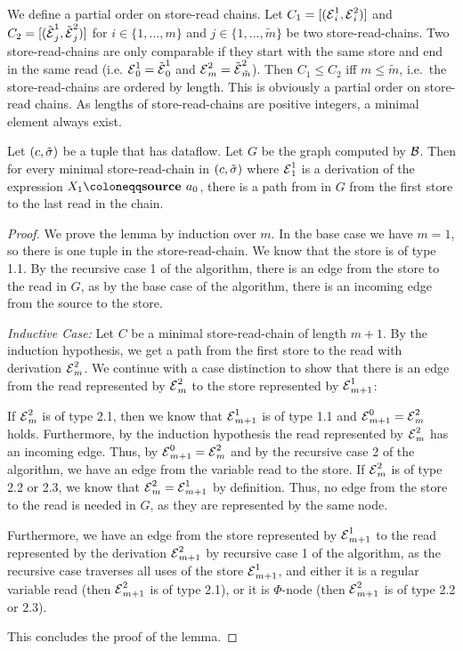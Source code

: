 \begin{definition}
    We define a partial order on store-read chains.
    Let $C_1 = [(\operatorname{\mathcal{E}}^1_i, \operatorname{\mathcal{E}}^2_i)]$ and $C_2 = [(\tilde{\operatorname{\mathcal{E}}}^1_j, \tilde{\operatorname{\mathcal{E}}}^2_j)]$ for $i \in \{1, \ldots, m\}$ and
    $j \in \{1, \ldots, \tilde{m}\}$ be two store-read-chains.
    Two store-read-chains are only comparable if they start with the same store and 
    end in the same read (i.e. $\operatorname{\mathcal{E}}^1_0 = \tilde{\operatorname{\mathcal{E}}}^1_0$ and $\operatorname{\mathcal{E}}^2_m = \tilde{\operatorname{\mathcal{E}}}^2_{\tilde{m}}$).
    Then $C_1 \leq C_2$ iff $m \leq \tilde{m}$, i.e.\ the store-read-chains are ordered by length.
    This is obviously a partial order on store-read chains.
    As lengths of store-read-chains are positive integers, a minimal element always exist.
\end{definition}

\begin{lemma}
    Let $(c, \tilde{\sigma}{})$ be a tuple that has dataflow.
    Let $G$ be the graph computed by $\operatorname{\mathcal{B}}$.
    Then for every minimal store-read-chain in $(c, \tilde{\sigma}{})$ where $\operatorname{\mathcal{E}}^1_1$ is a derivation of
    the expression $X_1 \coloneqq \source{a_0}$,
    there is a path from in $G$ from the first store to the last read in the chain.
    \label{lem:store-read-chain-path}
\end{lemma}
\begin{proof}
    We prove the lemma by induction over $m$.
    In the base case we have $m=1$, so there is one tuple in the store-read-chain.
    We know that the store is of type 1.1. By the recursive case 1 of the algorithm,
    there is an edge from the store to the read in $G$, as by the base case of the algorithm, there
    is an incoming edge from the source to the store.

    \emph{Inductive Case:} Let $C$ be a minimal store-read-chain of length $m+1$.
    By the induction hypothesis, we get a path from the first store to the read 
    with derivation $\operatorname{\mathcal{E}}^2_m$.
    We continue with a case distinction to show that there is an edge from the read 
    represented by $\operatorname{\mathcal{E}}^2_m$ to the store represented by $\operatorname{\mathcal{E}}^1_{m+1}$:
    
    If $\operatorname{\mathcal{E}}^2_m$ is of type 2.1, then we know that $\operatorname{\mathcal{E}}^1_{m+1}$ is of type 1.1 and $\operatorname{\mathcal{E}}^0_{m+1} = \operatorname{\mathcal{E}}^2_m$ holds.
    Furthermore, by the induction hypothesis the read represented by $\operatorname{\mathcal{E}}^2_m$ has an incoming edge.
    Thus, by $\operatorname{\mathcal{E}}^0_{m+1} = \operatorname{\mathcal{E}}^2_m$ and by the recursive case 2 of the algorithm, we have 
    an edge from the variable read to the store.
    If $\operatorname{\mathcal{E}}^2_m$ is of type 2.2 or 2.3, we know that $\operatorname{\mathcal{E}}^2_m = \operatorname{\mathcal{E}}^1_{m+1}$ by definition.
    Thus, no edge from the store to the read is needed in $G$, as they are represented by the same node.

    Furthermore, we have an edge from the store represented by $\operatorname{\mathcal{E}}^1_{m+1}$ to the read represented by 
    the derivation $\operatorname{\mathcal{E}}^2_{m+1}$ by recursive case 1 of the algorithm,
    as the recursive case traverses all uses of the store $\operatorname{\mathcal{E}}^1_{m+1}$, and either it is a regular variable read 
    (then $\operatorname{\mathcal{E}}^2_{m+1}$ is of type 2.1), or it is $\Phi$-node (then $\operatorname{\mathcal{E}}^2_{m+1}$ is of type 2.2 or 2.3).

    This concludes the proof of the lemma.
\end{proof}

